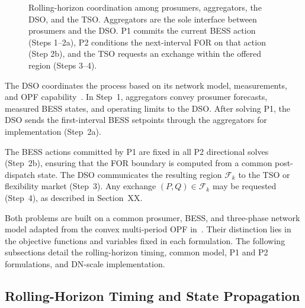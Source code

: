 \documentclass[journal]{IEEEtran}
\begin{document}
\begin{figure}[h!]
{%
}
\caption{Rolling-horizon coordination among prosumers, aggregators, the DSO, and the TSO. Aggregators are the sole interface between prosumers and the DSO. P1 commits the current BESS action (Steps 1--2a), P2
conditions the next-interval FOR on that action (Step 2b), and the TSO requests an exchange within the offered region (Steps 3--4).}
\label{fig:coordination_concept}
\end{figure}

The DSO coordinates the process based on its network model, measurements, and OPF capability~\cite{frueh2023,petrou2021,liu2022}. In Step~1, aggregators convey prosumer forecasts, measured BESS states, and operating limits to the DSO. After solving P1, the DSO sends the first-interval BESS setpoints through the aggregators for implementation (Step~2a).

The BESS actions committed by P1 are fixed in all P2 directional solves (Step~2b), ensuring that the FOR boundary is computed from a common post-dispatch state. The DSO communicates the resulting region $\mathcal{F}_k$ to the TSO or flexibility market (Step~3). Any exchange $(P,Q)\in\mathcal{F}_k$ may be requested (Step~4), as described in Section~XX.

Both problems are built on a common prosumer, BESS, and three-phase network model adapted from the convex multi-period OPF in~\cite{gutierrez2021}. Their distinction lies in the objective functions and variables fixed in each formulation. The following subsections detail the rolling-horizon timing, common model, P1 and P2 formulations, and DN-scale implementation.

\subsection{Rolling-Horizon Timing and State Propagation}
\label{ssec:timing}
\end{document}
